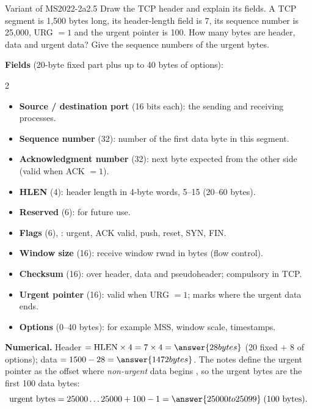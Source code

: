 \begin{question}{Variant of MS2022-2a}{2.5}
Draw the TCP header and explain its fields. A TCP segment is 1,500 bytes long, its header-length field is 7, its sequence number is 25,000, URG $=1$ and the urgent pointer is 100. How many bytes are header, data and urgent data? Give the sequence numbers of the urgent bytes.
\end{question}
\begin{solution}
\textbf{Fields} (20-byte fixed part plus up to 40 bytes of options):
\begin{multicols}{2}\small
\begin{itemize}
\item \textbf{Source / destination port} (16 bits each): the sending and receiving processes.
\item \textbf{Sequence number} (32): number of the first data byte in this segment.
\item \textbf{Acknowledgment number} (32): next byte expected from the other side (valid when ACK $=1$).
\item \textbf{HLEN} (4): header length in 4-byte words, 5--15 (20--60 bytes).
\item \textbf{Reserved} (6): for future use.
\item \textbf{Flags} (6), : urgent, ACK valid, push, reset, SYN, FIN.
\item \textbf{Window size} (16): receive window rwnd in bytes (flow control).
\item \textbf{Checksum} (16): over header, data and pseudoheader; compulsory in TCP.
\item \textbf{Urgent pointer} (16): valid when URG $=1$; marks where the urgent data ends.
\item \textbf{Options} (0--40 bytes): for example MSS, window scale, timestamps.
\end{itemize}
\end{multicols}
\textbf{Numerical.}
Header $= \text{HLEN}\times4 = 7\times4 = \answer{28 bytes}$ (20 fixed $+$ 8 of options); data $=1500-28=\answer{1472 bytes}$.
The notes define the urgent pointer as the offset where \emph{non-urgent} data begins , so the urgent bytes are the first 100 data bytes:
\[ \text{urgent bytes} = 25000 \ldots 25000+100-1 = \answer{25000 to 25099} \;(100 \text{ bytes}). \]
\end{solution}

